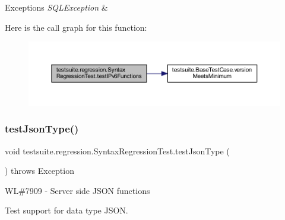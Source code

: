 \begin{DoxyExceptions}{Exceptions}
{\em S\+Q\+L\+Exception} & \\
\hline
\end{DoxyExceptions}
Here is the call graph for this function\+:
\nopagebreak
\begin{figure}[H]
\begin{center}
\leavevmode
\includegraphics[width=350pt]{classtestsuite_1_1regression_1_1_syntax_regression_test_af681c26981536cc82b5c316136ec34ea_cgraph}
\end{center}
\end{figure}
\mbox{\label{classtestsuite_1_1regression_1_1_syntax_regression_test_a5490dab20bfc43225f9eb3fbf812e349}} 
\subsubsection{\texorpdfstring{test\+Json\+Type()}{testJsonType()}}
{\footnotesize\ttfamily void testsuite.\+regression.\+Syntax\+Regression\+Test.\+test\+Json\+Type (\begin{DoxyParamCaption}{ }\end{DoxyParamCaption}) throws Exception}

WL\#7909 -\/ Server side J\+S\+ON functions

Test support for data type J\+S\+ON.

